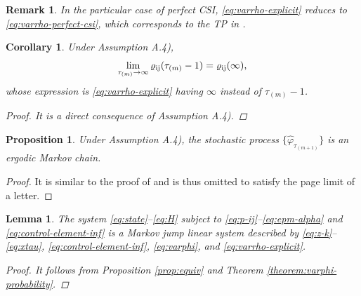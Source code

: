 \documentclass[letterpaper, 10 pt, conference]{ieeeconf}  %
\newtheorem{corollary}{Corollary}[theorem]
\newtheorem{remark}{Remark}
\newtheorem{lemma}{Lemma}
\newtheorem{proposition}{Proposition}
\begin{document}
\begin{remark}\label{rem:automatica-2}
    In the particular case of perfect CSI, \eqref{eq:varrho-explicit} reduces to \eqref{eq:varrho-perfect-csi}, which corresponds to the TP in \cite[Eq. (30)]{yZL-2025-automatica}.
\end{remark}

\begin{corollary}\label{corollary:varrho-inf}
    Under Assumption A.4), 
\begin{equation}
    \text{\small $\lim_{\tau_{(m)}\to \infty} \varrho_{\mathrm{i}\mathrm{j}}(\tau_{(m)}-1) = \varrho_{\mathrm{i}\mathrm{j}}(\infty)$},
\end{equation}
whose expression is \eqref{eq:varrho-explicit} having $\infty$ instead of $\tau_{(m)}-1$.

\begin{proof}
    It is a direct consequence of Assumption A.4).
\end{proof}
\end{corollary}

\begin{proposition}\label{prop:ergodicity}
	Under Assumption A.4), the stochastic process $\{\hat{\varphi}_{\tau_{(m+1)}}\}$ is an ergodic Markov chain.
\end{proposition}
\begin{proof}
    It is similar to the proof of \cite[Prop. 15]{yZL-2025-automatica} and is thus omitted to satisfy the page limit of a letter. 
\end{proof}
\begin{lemma}\label{lemma:mjls-stability}
    The system \eqref{eq:state}--\eqref{eq:H} subject to \eqref{eq:p-ij}--\eqref{eq:epm-alpha} and \eqref{eq:control-element-inf} is a Markov jump linear system %
    described by \eqref{eq:z-k}--\eqref{eq:xtau}, \eqref{eq:control-element-inf}, \eqref{eq:varphi}, and \eqref{eq:varrho-explicit}.

\begin{proof}
    It follows from Proposition \ref{prop:equiv} %
    and Theorem \ref{theorem:varphi-probability}.
\end{proof}
\end{lemma}
\end{document}
